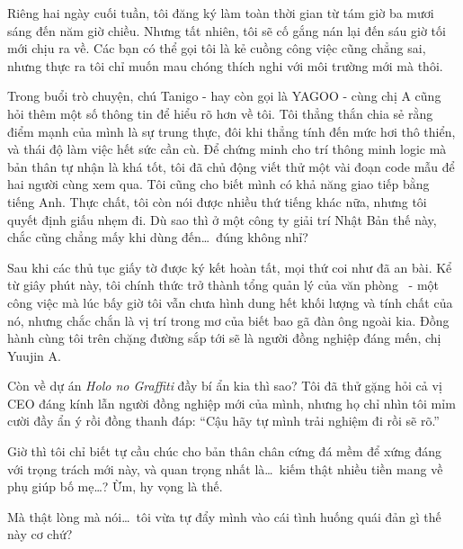 \documentclass[../main.tex]{subfiles}
\begin{document}
Riêng hai ngày cuối tuần, tôi đăng ký làm toàn thời gian từ tám giờ ba mươi sáng đến năm giờ chiều. Nhưng tất nhiên, tôi sẽ cố gắng nán lại đến sáu giờ tối mới chịu ra về. Các bạn có thể gọi tôi là kẻ cuồng công việc cũng chẳng sai, nhưng thực ra tôi chỉ muốn mau chóng thích nghi với môi trường mới mà thôi.

Trong buổi trò chuyện, chú Tanigo - hay còn gọi là YAGOO - cùng chị A cũng hỏi thêm một số thông tin để hiểu rõ hơn về tôi. Tôi thẳng thắn chia sẻ rằng điểm mạnh của mình là sự trung thực, đôi khi thẳng tính đến mức hơi thô thiển, và thái độ làm việc hết sức cần cù. Để chứng minh cho trí thông minh logic mà bản thân tự nhận là khá tốt, tôi đã chủ động viết thử một vài đoạn code mẫu để hai người cùng xem qua. Tôi cũng cho biết mình có khả năng giao tiếp bằng tiếng Anh. Thực chất, tôi còn nói được nhiều thứ tiếng khác nữa, nhưng tôi quyết định giấu nhẹm đi. Dù sao thì ở một công ty giải trí Nhật Bản thế này, chắc cũng chẳng mấy khi dùng đến\dots\ đúng không nhỉ?

Sau khi các thủ tục giấy tờ được ký kết hoàn tất, mọi thứ coi như đã an bài. Kể từ giây phút này, tôi chính thức trở thành tổng quản lý của văn phòng \hll\ - một công việc mà lúc bấy giờ tôi vẫn chưa hình dung hết khối lượng và tính chất của nó, nhưng chắc chắn là vị trí trong mơ của biết bao gã đàn ông ngoài kia. Đồng hành cùng tôi trên chặng đường sắp tới sẽ là người đồng nghiệp đáng mến, chị Yuujin A.

Còn về dự án \textit{Holo no Graffiti} đầy bí ẩn kia thì sao? Tôi đã thử gặng hỏi cả vị CEO đáng kính lẫn người đồng nghiệp mới của mình, nhưng họ chỉ nhìn tôi mỉm cười đầy ẩn ý rồi đồng thanh đáp: ``Cậu hãy tự mình trải nghiệm đi rồi sẽ rõ.''

Giờ thì tôi chỉ biết tự cầu chúc cho bản thân chân cứng đá mềm để xứng đáng với trọng trách mới này, và quan trọng nhất là\dots\ kiếm thật nhiều tiền mang về phụ giúp bố mẹ\dots? Ừm, hy vọng là thế.

Mà thật lòng mà nói\dots\ tôi vừa tự đẩy mình vào cái tình huống quái đản gì thế này cơ chứ?
\end{document}
